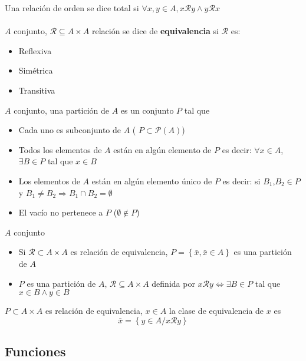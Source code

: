 \documentclass[a4paper,10pt]{article}
\begin{document}
 Una relación de orden se dice total si $\forall x,y \in A, x \mathcal{R} y \wedge y \mathcal{R} x$ \\ \\
 $A$ conjunto, $\mathcal{R} \subseteq A \times A$ relación se dice de \textbf{equivalencia} si $\mathcal{R}$ es: 
\begin{itemize}
	\item Reflexiva
	\item Simétrica
	\item Transitiva
\end{itemize}
 $A$ conjunto, una partición de $A$ es un conjunto $P$ tal que
\begin{itemize}
	\item Cada uno es subconjunto de $A$ ( $P \subset \mathcal{P}(A)$)
	\item Todos los elementos de $A$ están en algún elemento de $P$ es decir: $\forall x \in A$, \ $\exists B \in P$ tal que $x \in B$ 
	\item Los elementos de $A$ están en algún elemento único de $P$ es decir: si $B_1$,$B_2 \in P$ y $B_1 \not = B_2 \Rightarrow B_1 \cap B_2 = \emptyset$
	\item El vacío no pertenece a $P$ ($\emptyset \not \in P$)
\end{itemize}
\teorema $A$ conjunto
\begin{itemize}
	\item Si $\mathcal{R} \subset A \times A$ es relación de equivalencia, $P = \left \{ \bar{x}, \bar{x} \in A \right \}$ es una partición de $A$
	\item $P$ es una partición de $A$, $\mathcal{R} \subseteq A \times A$ definida por $x \mathcal{R} y \Leftrightarrow \exists B \in P$ tal que $x \in B \wedge y \in B$
\end{itemize} 
 $P \subset A \times A$ es relación de equivalencia, $x \in A$ la clase de equivalencia de $x$ es
$$\bar{x} = \left\{y \in A / x \mathcal{R} y \right\}$$


\subsection{Funciones}
\end{document}
